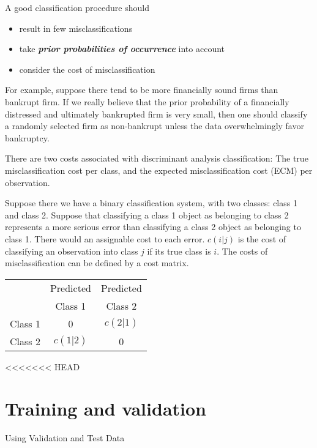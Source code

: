 \documentclass[a4paper,12pt]{article}
\begin{document}
A good classification procedure should
 \begin{itemize}
 \item result in few misclassifications
 \item take \textbf{\textit{prior probabilities of occurrence}} into account
 \item consider the cost of misclassification
 \end{itemize}
 
For example, suppose there tend to be more financially sound firms than bankrupt
firm. If we really believe that the prior probability of a financially
distressed and ultimately bankrupted firm is very small, then one should
classify a randomly selected firm as non-bankrupt unless the data
overwhelmingly favor bankruptcy.



There are two costs associated with discriminant analysis classification: The true misclassification cost per class, and the expected misclassification cost (ECM) per observation.

Suppose there we have a binary classification system, with two classes: class 1 and class 2.
Suppose that classifying a class 1 object as belonging to class 2 represents a more serious error than classifying a class 2 object as belonging to class 1. There would an assignable cost to each error.
$c(i|j)$ is the cost of classifying an observation into class $j$ if its true class is $i$.
The costs of misclassification can be defined by a cost matrix.

\begin{tabular}{|c|c|c|}
  \hline
  & Predicted & Predicted \\
   & Class 1 & Class 2 \\  \hline
  Class 1 & 0 & $c(2|1)$  \\
  Class 2 & $c(1|2)$ & 0 \\
  \hline
\end{tabular}

<<<<<<< HEAD



\section{Training and validation}
Using Validation and Test Data

\end{document}
